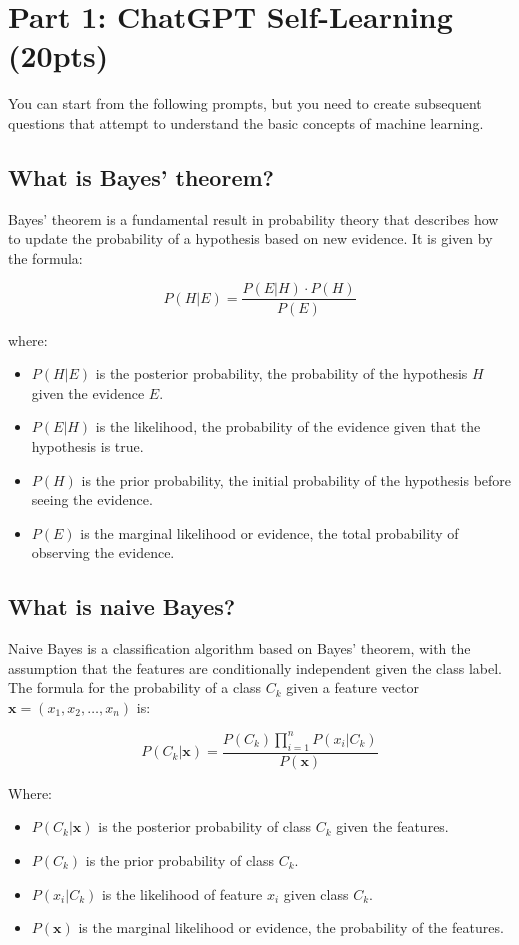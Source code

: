 \section{Part 1: ChatGPT Self-Learning (20pts)}

You can start from the following prompts, but you need to create subsequent questions that attempt to understand the basic concepts of machine learning.

\subsection{What is Bayes' theorem?}

Bayes' theorem is a fundamental result in probability theory that describes how to update the probability of a hypothesis based on new evidence. It is given by the formula:

\[
P(H|E) = \frac{P(E|H) \cdot P(H)}{P(E)}
\]

where:
\begin{itemize}
    \item \(P(H|E)\) is the posterior probability, the probability of the hypothesis \(H\) given the evidence \(E\).
    \item \(P(E|H)\) is the likelihood, the probability of the evidence given that the hypothesis is true.
    \item \(P(H)\) is the prior probability, the initial probability of the hypothesis before seeing the evidence.
    \item \(P(E)\) is the marginal likelihood or evidence, the total probability of observing the evidence.
\end{itemize}


\subsection{What is naive Bayes?}

Naive Bayes is a classification algorithm based on Bayes' theorem, with the assumption that the features are conditionally independent given the class label. The formula for the probability of a class \( C_k \) given a feature vector \( \mathbf{x} = (x_1, x_2, \dots, x_n) \) is:

\[
P(C_k | \mathbf{x}) = \frac{P(C_k) \prod_{i=1}^{n} P(x_i | C_k)}{P(\mathbf{x})}
\]

Where:
\begin{itemize}
    \item \( P(C_k | \mathbf{x}) \) is the posterior probability of class \( C_k \) given the features.
    \item \( P(C_k) \) is the prior probability of class \( C_k \).
    \item \( P(x_i | C_k) \) is the likelihood of feature \( x_i \) given class \( C_k \).
    \item \( P(\mathbf{x}) \) is the marginal likelihood or evidence, the probability of the features.
\end{itemize}

